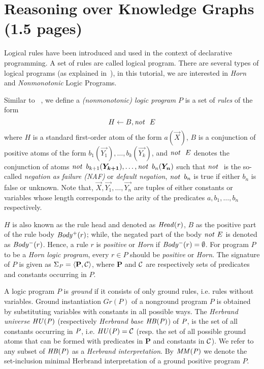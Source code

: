 \section{Reasoning over Knowledge Graphs (1.5 pages)}
\label{sec:reasoning}

 Logical rules have been introduced and used in the context of declarative programming. A set of rules are called logical program. There are several types of logical programs (as explained in~\cite{DBLP:books/sp/Lloyd87}), in this tutorial, we are interested in \textit{Horn} and \textit{Nonmonotonic} Logic Programs.

Similar to ~\cite{DBLP:books/sp/Lloyd87}, we define a \emph{(nonmonotonic) logic program} $P$ is a set of \emph{rules} of the form
\begin{equation}
H\leftarrow B, \mathit{not}~ \ E
\end{equation}
 where $H$ is a standard first-order atom of the form $a(\vec{X})$, $B$ is a conjunction of positive atoms of the form $b_1(\vec{Y_1}),\dotsc,b_k(\vec{Y_k})$, and $\mathit{not}~ \ E$ %
 denotes the conjunction of atoms $\naf\, b_{k+1}(\vec{Y_{k+1}}),\dotsc,\naf\, b_n(\vec{Y_{n}})$ such that $\naf$ is the so-called \emph{negation as failure (NAF)} or \emph{default negation}, \ie $\mathit{not}~ \, b_n$ is true if either $b_n$ is false or unknown. Note that, $\vec{X},\vec{Y_1},\ldots,\vec{Y_{n}}$ are tuples of either constants or variables whose length corresponds to the arity of the predicates $a,b_1,\ldots,b_n$ respectively.
 
$H$ is also known as the rule head and denoted as $\mathit{Head(r)}$, $B$ as the positive part of the rule body $\mathit{Body^+}(r)$; while, the negated part of the body $ \mathit{not}~ E$ is denoted as $\mathit{Body^-}(r)$. Hence, a rule $r$ is \emph{positive} or
\emph{Horn} if $\mathit{Body^-}(r)=\emptyset$. For program $P$ to be a \textit{Horn logic program}, every $r \in P$ should be \emph{positive} or \emph{Horn}. 
  The signature of $P$ is given as $\Sigma_{\mathit{P}}=\langle\mathbf{P},\mathcal{C}\rangle$, where $\mathbf{P}$ and $\mathcal{C}$ are respectively sets of predicates and constants occurring in $P$. 

 A logic program $P$ is \emph{ground} if it consists of only ground rules, i.e. rules without
variables. Ground instantiation $Gr(P)$ of a nonground program $P$ is obtained by substituting variables with constants in all possible ways. The \emph{Herbrand universe}  $\mathit{HU(P)}$ (respectively \emph{Herbrand base} $\mathit{HB(P)}$) of $\mathit{P}$, is the set of all constants occurring in $\mathit{P}$, i.e.  $\mathit{HU(P)}=\mathcal{C}$ (resp.
the set of all possible ground atoms that can be formed with predicates in $\mathbf{P}$
and constants in $\mathcal{C}$). We refer to any subset of $\mathit{HB(P)}$ as a \emph{Herbrand interpretation}. By $\mathit{MM(P)}$ we denote the set-inclusion minimal Herbrand interpretation of a ground positive program $P$.



